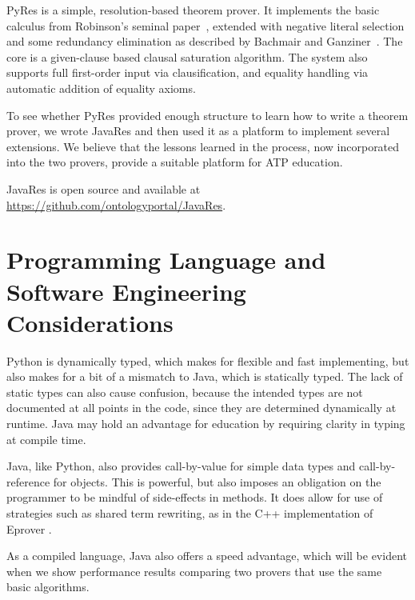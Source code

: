 \documentclass{llncs}
\begin{document}
PyRes is a simple, resolution-based theorem prover. It implements the
basic calculus from Robinson's seminal paper~\cite{Ro65}, extended
with negative literal selection and some redundancy elimination as
described by Bachmair and Ganziner~\cite{BG:HBAR-2001}. The core is a
given-clause based clausal saturation algorithm. The system also
supports full first-order input via clausification, and equality
handling via automatic addition of equality axioms.

To see whether PyRes provided
enough structure to learn how to write a theorem prover, we wrote
JavaRes and then used it as a platform to
implement several extensions.  We believe that the lessons learned
in the process, now incorporated into the two provers,
provide a suitable platform for ATP education.

JavaRes is open source and available at \url{https://github.com/ontologyportal/JavaRes}.




\section{Programming Language and Software Engineering Considerations}

Python is dynamically typed, which makes for flexible and fast
implementing, but also makes for a bit of a mismatch to Java, which is
statically typed.  The lack of static types can also cause confusion,
because the intended types are not documented at all points in the
code, since they are determined dynamically at runtime.  Java may hold
an advantage for education by requiring clarity in typing at compile
time.

Java, like Python, also provides call-by-value for simple data types
and call-by-reference for objects.  This is powerful, but also imposes
an obligation on the programmer to be mindful of side-effects in
methods.  It does allow for use of strategies such as shared term
rewriting, as in the C++ implementation of Eprover \cite{LS:LPAR-WS-2001}.

As a compiled language, Java also offers a speed advantage, which will
be evident when we show performance results comparing two provers that
use the same basic algorithms.
\end{document}
